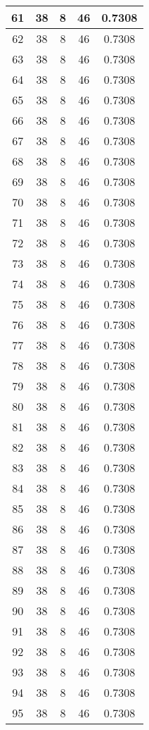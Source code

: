 \documentclass[letterpaper, 12pt]{article}
\begin{document}
\begin{longtable}{|c|c|c|c|c|}
61 & 38 & 8 & 46 & 0.7308 \\
\hline
62 & 38 & 8 & 46 & 0.7308 \\
\hline
63 & 38 & 8 & 46 & 0.7308 \\
\hline
64 & 38 & 8 & 46 & 0.7308 \\
\hline
65 & 38 & 8 & 46 & 0.7308 \\
\hline
66 & 38 & 8 & 46 & 0.7308 \\
\hline
67 & 38 & 8 & 46 & 0.7308 \\
\hline
68 & 38 & 8 & 46 & 0.7308 \\
\hline
69 & 38 & 8 & 46 & 0.7308 \\
\hline
70 & 38 & 8 & 46 & 0.7308 \\
\hline
71 & 38 & 8 & 46 & 0.7308 \\
\hline
72 & 38 & 8 & 46 & 0.7308 \\
\hline
73 & 38 & 8 & 46 & 0.7308 \\
\hline
74 & 38 & 8 & 46 & 0.7308 \\
\hline
75 & 38 & 8 & 46 & 0.7308 \\
\hline
76 & 38 & 8 & 46 & 0.7308 \\
\hline
77 & 38 & 8 & 46 & 0.7308 \\
\hline
78 & 38 & 8 & 46 & 0.7308 \\
\hline
79 & 38 & 8 & 46 & 0.7308 \\
\hline
80 & 38 & 8 & 46 & 0.7308 \\
\hline
81 & 38 & 8 & 46 & 0.7308 \\
\hline
82 & 38 & 8 & 46 & 0.7308 \\
\hline
83 & 38 & 8 & 46 & 0.7308 \\
\hline
84 & 38 & 8 & 46 & 0.7308 \\
\hline
85 & 38 & 8 & 46 & 0.7308 \\
\hline
86 & 38 & 8 & 46 & 0.7308 \\
\hline
87 & 38 & 8 & 46 & 0.7308 \\
\hline
88 & 38 & 8 & 46 & 0.7308 \\
\hline
89 & 38 & 8 & 46 & 0.7308 \\
\hline
90 & 38 & 8 & 46 & 0.7308 \\
\hline
91 & 38 & 8 & 46 & 0.7308 \\
\hline
92 & 38 & 8 & 46 & 0.7308 \\
\hline
93 & 38 & 8 & 46 & 0.7308 \\
\hline
94 & 38 & 8 & 46 & 0.7308 \\
\hline
95 & 38 & 8 & 46 & 0.7308 \\

\end{longtable}
\end{document}
